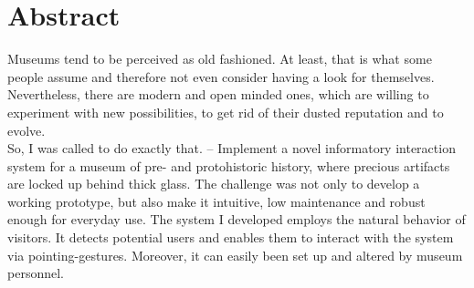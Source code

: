 \chapter{Abstract}
\label{abstract}


Museums tend to be perceived as old fashioned. At least, that is what some people assume and therefore not even consider having a look for themselves. Nevertheless, there are modern and open minded ones, which are willing to experiment with new possibilities, to get rid of their dusted reputation and to evolve.
\\
So, I was called to do exactly that. -- Implement a novel informatory interaction system for a museum of pre- and protohistoric history, where precious artifacts are locked up behind thick glass. The challenge was not only to develop a working prototype, but also make it intuitive, low maintenance and robust enough for everyday use. The system I developed employs the natural behavior of visitors. It detects potential users and enables them to interact with the system via pointing-gestures. Moreover, it can easily been set up and altered by museum personnel.

%
%
%
